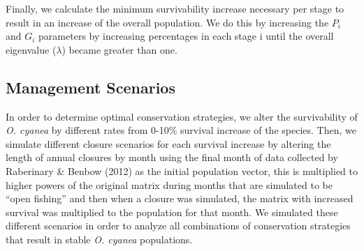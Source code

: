 \documentclass[
]{article}
\begin{document}
Finally, we calculate the minimum survivability increase necessary per stage to result in an increase of the overall population. We do this by increasing the \(P_i\) and \(G_i\) parameters by increasing percentages in each stage i until the overall eigenvalue (\(\lambda\)) became greater than one.

\hypertarget{management-scenarios}{%
\subsection{Management Scenarios}\label{management-scenarios}}

In order to determine optimal conservation strategies, we alter the survivability of \emph{O. cyanea} by different rates from 0-10\% survival increase of the species. Then, we simulate different closure scenarios for each survival increase by altering the length of annual closures by month using the final month of data collected by Raberinary \& Benbow (2012) as the initial population vector, this is multiplied to higher powers of the original matrix during months that are simulated to be ``open fishing'' and then when a closure was simulated, the matrix with increased survival was multiplied to the population for that month. We simulated these different scenarios in order to analyze all combinations of conservation strategies that result in stable \emph{O. cyanea} populations.

\begin{table}

\caption{\label{tab:LifeHistory}Existing research and information on the per-stage duration of \emph{O. cyanea}. All existing estimates are from Heukelem (1973), Heukelem (1976), Guard \& Mgaya (2003), Humber et al. (2006), Aina (2009). Note: Heukelem (1976) estimate the time to maturity to be 10-13 months (i.e.~stages 1-3 combined). Equations used to estimate metrics from this Lefkovitch Matrix are outlined in Barot et al. (2002). \label{LifeHistory}}
\centering
{}
\end{table}
\end{document}
